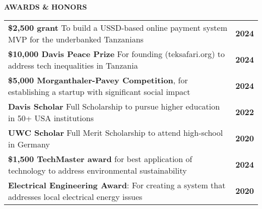 \begin{rSection}{\small \normalfont \textbf {AWARDS \& HONORS}}

    \begin{tabular}{ p{17.1cm} r}
        \textbf{\$2,500 grant} To build a USSD-based online payment system MVP for the underbanked Tanzanians& {\bfseries \footnotesize 2024} \\
        
        \textbf{\$10,000 Davis Peace Prize} For founding (teksafari.org) to address tech inequalities in Tanzania & {\bfseries \footnotesize 2024} \\
        
        \textbf{\$5,000 Morganthaler-Pavey Competition}, for establishing a startup with significant social impact  & {\bfseries \footnotesize 2024} \\

        \textbf{Davis Scholar} Full Scholarship to pursue higher education in 50+ USA institutions & {\bfseries \footnotesize 2022} \\

        \textbf{UWC Scholar} Full Merit Scholarship to attend high-school in Germany & {\bfseries \footnotesize 2020} \\

        \textbf{\$1,500 TechMaster award} for best application of technology to address environmental sustainability & {\bfseries \footnotesize 2024} \\
    
        \textbf{Electrical Engineering Award}: For creating a system that addresses local electrical energy issues& \textbf{\footnotesize 2020} \\
    \end{tabular}

\end{rSection}